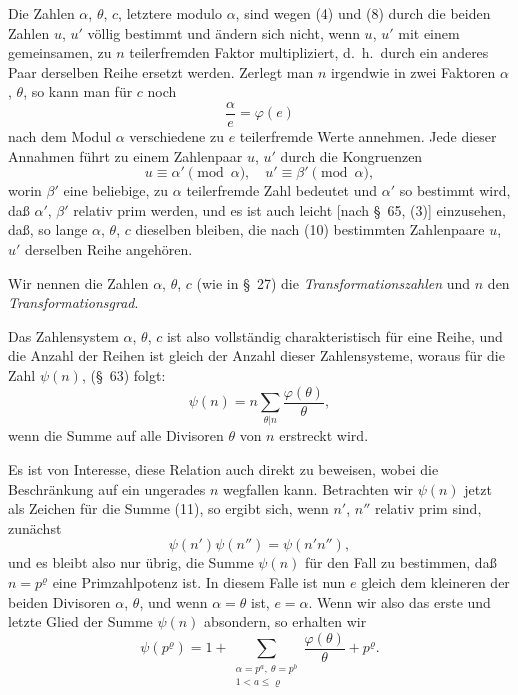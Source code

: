 \documentclass[12pt,a4paper]{article}
\theoremstyle{definition}
\begin{document}
Die Zahlen $\alpha$, $\theta$, $c$, letztere modulo $\alpha$, sind wegen (4) und (8) durch die beiden Zahlen $u$, $u'$ völlig bestimmt und ändern sich nicht, wenn $u$, $u'$ mit einem gemeinsamen, zu $n$ teilerfremden Faktor multipliziert, d.~h.\ durch ein anderes Paar derselben Reihe ersetzt werden. Zerlegt man $n$ irgendwie in zwei Faktoren $\alpha$, $\theta$, so kann man für $c$ noch
\[
\frac{\alpha}{e} = \varphi(e)
\]
nach dem Modul $\alpha$ verschiedene zu $e$ teilerfremde Werte annehmen. Jede dieser Annahmen führt zu einem Zahlenpaar $u$, $u'$ durch die Kongruenzen
\begin{equation}\label{eq:68-10}
u \equiv \alpha' \pmod{\alpha}, \quad u' \equiv \beta' \pmod{\alpha},
\end{equation}
worin $\beta'$ eine beliebige, zu $\alpha$ teilerfremde Zahl bedeutet und $\alpha'$ so bestimmt wird, daß $\alpha'$, $\beta'$ relativ prim werden, und es ist auch leicht [nach \S\ 65, (3)] einzusehen, daß, so lange $\alpha$, $\theta$, $c$ dieselben bleiben, die nach (10) bestimmten Zahlenpaare $u$, $u'$ derselben Reihe angehören.

Wir nennen die Zahlen $\alpha$, $\theta$, $c$ (wie in \S\ 27) die \emph{Transformationszahlen} und $n$ den \emph{Transformationsgrad}.

Das Zahlensystem $\alpha$, $\theta$, $c$ ist also vollständig charakteristisch für eine Reihe, und die Anzahl der Reihen ist gleich der Anzahl dieser Zahlensysteme, woraus für die Zahl $\psi(n)$, (\S\ 63) folgt:
\begin{equation}\label{eq:68-11}
\psi(n) = n \sum_{\theta|n} \frac{\varphi(\theta)}{\theta},
\end{equation}
wenn die Summe auf alle Divisoren $\theta$ von $n$ erstreckt wird.

Es ist von Interesse, diese Relation auch direkt zu beweisen, wobei die Beschränkung auf ein ungerades $n$ wegfallen kann. Betrachten wir $\psi(n)$ jetzt als Zeichen für die Summe (11), so ergibt sich, wenn $n'$, $n''$ relativ prim sind, zunächst
\[
\psi(n')\psi(n'') = \psi(n'n''),
\]
und es bleibt also nur übrig, die Summe $\psi(n)$ für den Fall zu bestimmen, daß $n = p^\varrho$ eine Primzahlpotenz ist. In diesem Falle ist nun $e$ gleich dem kleineren der beiden Divisoren $\alpha$, $\theta$, und wenn $\alpha = \theta$ ist, $e = \alpha$. Wenn wir also das erste und letzte Glied der Summe $\psi(n)$ absondern, so erhalten wir
\[
\psi(p^\varrho) = 1 + \sum_{\substack{\alpha = p^a,\ \theta = p^b \\ 1 < a \leq \varrho}} \frac{\varphi(\theta)}{\theta} + p^\varrho.
\]
\end{document}
